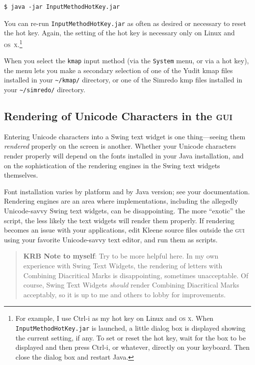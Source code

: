 \documentclass[letterpaper,12pt]{article}
\newcommand{\acro}{\textsc}
\begin{document}
\begin{Verbatim}[fontsize=\small]
$ java -jar InputMethodHotKey.jar
\end{Verbatim}

\noindent
You can re-run \texttt{InputMethodHotKey.jar} as often as desired
or necessary to reset the hot key.
Again, the setting of the hot key is necessary only on Linux and
\acro{os~x}.\footnote{For example, I use Ctrl-i as my hot key on Linux
and \acro{os x}.  When \texttt{InputMethodHotKey.jar} is launched, a
little dialog box is displayed showing the current setting, if any.  To
set or reset the hot key, wait for the box to be displayed and then press
Ctrl-i, or whatever, directly on your keyboard. Then close the dialog box
and restart Java.}

When you select the \texttt{kmap} input method (via the \texttt{System}
menu, or via a hot key), the menu lets you make a secondary selection of
one of the Yudit kmap files installed in your \texttt{\~{}/kmap/}
directory, or one of the Simredo kmp files installed in your
\texttt{\~{}/simredo/} directory.

\subsection{Rendering of Unicode Characters in the \acro{gui}}

Entering Unicode characters into a Swing text widget is one
thing---seeing them \emph{rendered} properly on the screen is another.
Whether your Unicode characters render properly will depend on the fonts
installed in your Java installation, and on the sophistication of the
rendering engines in the Swing text widgets themselves.

Font installation varies by platform and by Java version; see your
documentation.  Rendering engines are an area where
implementations, including the allegedly Unicode-savvy Swing text
widgets, can be disappointing.  The more ``exotic'' the script,
the less likely the text widgets will render them properly.  If
rendering becomes an issue with your applications, edit 
Kleene source files outside the \acro{gui} using your favorite Unicode-savvy text editor,
and run them as scripts.

\begin{quote}
\textbf{KRB Note to myself}: Try to be more helpful here.  In my own
experience with Swing Text Widgets, the rendering of letters with
Combining Diacritical Marks is disappointing, sometimes unacceptable.  Of
course, Swing Text Widgets \emph{should} render Combining Diacritical
Marks acceptably, so it is up to me and others to lobby for improvements.
\end{quote}
\end{document}
